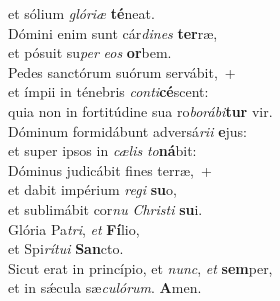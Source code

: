 \evenverse et sólium \textit{gló}\textit{ri}\textit{æ} \textbf{té}neat.\\
\oddverse Dómini enim sunt cár\textit{di}\textit{nes} \textbf{ter}ræ,~\*\\
\oddverse et pósuit su\textit{per} \textit{e}\textit{os} \textbf{or}bem.\\
\evenverse Pedes sanctórum suórum servábit,~+\\
\evenverse  et ímpii in ténebris \textit{con}\textit{ti}\textbf{cé}scent:~\*\\
\evenverse quia non in fortitúdine sua ro\textit{bo}\textit{rá}\textit{bi}\textbf{tur} vir.\\
\oddverse Dóminum formidábunt adversá\textit{ri}\textit{i} \textbf{e}jus:~\*\\
\oddverse et super ipsos in \textit{cæ}\textit{lis} \textit{to}\textbf{ná}bit:\\
\evenverse Dóminus judicábit fines terræ,~+\\
\evenverse  et dabit impérium \textit{re}\textit{gi} \textbf{su}o,~\*\\
\evenverse et sublimábit cor\textit{nu} \textit{Chri}\textit{sti} \textbf{su}i.\\
\oddverse Glória Pa\textit{tri}, \textit{et} \textbf{Fí}lio,~\*\\
\oddverse et Spi\textit{rí}\textit{tu}\textit{i} \textbf{San}cto.\\
\evenverse Sicut erat in princípio, et \textit{nunc}, \textit{et} \textbf{sem}per,~\*\\
\evenverse et in sǽcula sæ\textit{cu}\textit{ló}\textit{rum}. \textbf{A}men.\\
